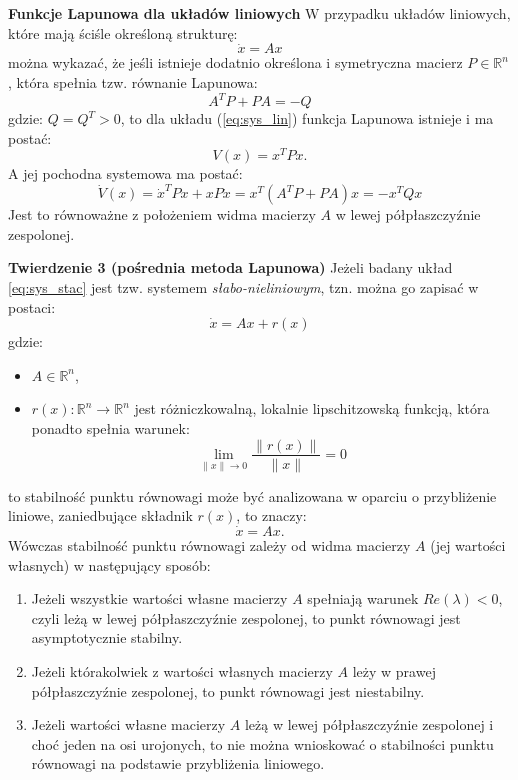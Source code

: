 \documentclass{article}
\begin{document}
\begin{tcolorbox}[colback=blue!5, colframe=blue!75!black, title=Ważne]
\textbf{Funkcje Lapunowa dla układów liniowych}
W przypadku układów liniowych, które mają ściśle określoną strukturę:
\begin{equation}\label{eq:sys_lin}
    \dot{x} = Ax
\end{equation}
można wykazać, że jeśli istnieje dodatnio określona i symetryczna macierz $P \in \mathbb{R}^{n}$, która spełnia tzw. równanie Lapunowa:
\begin{equation}\label{eq:rownanie_lapunowa}
    A^{T}P + PA = -Q
\end{equation}
gdzie: $Q=Q^{T} > 0$,
to dla układu (\ref{eq:sys_lin}) funkcja Lapunowa istnieje i ma postać:
\begin{equation}
    V(x) = x^{T}Px.
\end{equation}
A jej pochodna systemowa ma postać:
\begin{equation}\label{eq:lin_lap_div}
    \dot{V}(x) = \dot{x}^{T}Px + xP\dot{x} = x^{T}(A^{T}P + PA)x = -x^{T}Qx
\end{equation}
Jest to równoważne z położeniem widma macierzy $A$ w lewej półpłaszczyźnie
zespolonej.
\end{tcolorbox}

\textbf{Twierdzenie 3 (pośrednia metoda Lapunowa)}
Jeżeli badany układ \ref{eq:sys_stac} jest tzw. systemem \textit{słabo-nieliniowym}, tzn. można go zapisać w postaci:
\begin{equation}\label{eq:sys_slabo_niel}
    \dot{x} = Ax + r(x)
\end{equation}
gdzie:
\begin{itemize}
    \item $A \in \mathbb{R}^{n}$,
    \item $r(x): \mathbb{R}^{n} \rightarrow \mathbb{R}^{n}$ jest różniczkowalną, lokalnie lipschitzowską funkcją, która ponadto spełnia warunek:
    \begin{equation}\label{eq:warunek_slabo_niel}
        \lim_{\lVert x \rVert \rightarrow 0} \frac{\lVert r(x) \rVert}{\lVert x \rVert} = 0
    \end{equation}
\end{itemize}
to stabilność punktu równowagi może być analizowana w oparciu o przybliżenie liniowe, zaniedbujące składnik $r(x)$, to znaczy:
$$  
    \dot{x} = Ax.
$$
Wówczas stabilność punktu równowagi zależy od widma macierzy $A$ (jej wartości własnych) w następujący sposób:
\begin{enumerate}
    \item Jeżeli wszystkie wartości własne macierzy $A$ spełniają warunek $Re(\lambda) < 0$, czyli leżą w lewej półpłaszczyźnie zespolonej,  to punkt równowagi jest asymptotycznie stabilny.
    \item Jeżeli którakolwiek z wartości własnych macierzy $A$ leży w prawej półpłaszczyźnie zespolonej, to punkt równowagi jest niestabilny.
    \item Jeżeli wartości własne macierzy $A$ leżą w lewej półpłaszczyźnie zespolonej i choć jeden na osi urojonych, to nie można wnioskować o stabilności punktu równowagi na podstawie przybliżenia liniowego.
\end{enumerate}
\end{document}
